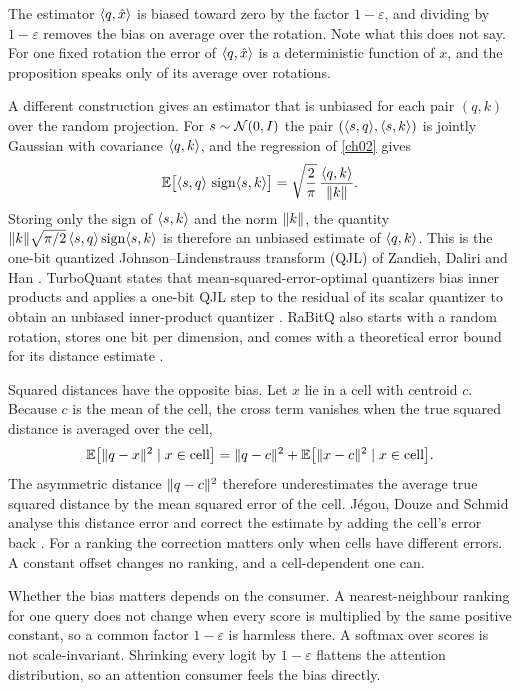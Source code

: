 The estimator $\langle q,\hat x\rangle$ is biased toward zero by the factor $1-\varepsilon$, and dividing by $1-\varepsilon$ removes the bias on average over the rotation. Note what this does not say. For one fixed rotation the error of $\langle q,\hat x\rangle$ is a deterministic function of $x$, and the proposition speaks only of its average over rotations.

A different construction gives an estimator that is unbiased for each pair $(q,k)$ over the random projection. For $s\sim\mathcal{N}(0,I)$ the pair $(\langle s,q\rangle,\langle s,k\rangle)$ is jointly Gaussian with covariance $\langle q,k\rangle$, and the regression of \cref{ch02} gives
\begin{equation}\label{eq:ch07:qjl}
\mathbb{E}\big[\langle s,q\rangle\,\operatorname{sign}\langle s,k\rangle\big]=\sqrt{\frac2\pi}\,\frac{\langle q,k\rangle}{\lVert k\rVert}.
\end{equation}
Storing only the sign of $\langle s,k\rangle$ and the norm $\lVert k\rVert$, the quantity $\lVert k\rVert\sqrt{\pi/2}\,\langle s,q\rangle\operatorname{sign}\langle s,k\rangle$ is therefore an unbiased estimate of $\langle q,k\rangle$. This is the one-bit quantized Johnson--Lindenstrauss transform (QJL) of Zandieh, Daliri and Han \cite{zandieh2024qjl}. TurboQuant states that mean-squared-error-optimal quantizers bias inner products and applies a one-bit QJL step to the residual of its scalar quantizer to obtain an unbiased inner-product quantizer \cite{zandieh2025turboquant}. RaBitQ also starts with a random rotation, stores one bit per dimension, and comes with a theoretical error bound for its distance estimate \cite{gao2024rabitq}.

Squared distances have the opposite bias. Let $x$ lie in a cell with centroid $c$. Because $c$ is the mean of the cell, the cross term vanishes when the true squared distance is averaged over the cell,
\begin{equation}\label{eq:ch07:distbias}
\mathbb{E}\big[\lVert q-x\rVert^2\mid x\in\text{cell}\big]=\lVert q-c\rVert^2+\mathbb{E}\big[\lVert x-c\rVert^2\mid x\in\text{cell}\big].
\end{equation}
The asymmetric distance $\lVert q-c\rVert^2$ therefore underestimates the average true squared distance by the mean squared error of the cell. J\'egou, Douze and Schmid analyse this distance error and correct the estimate by adding the cell's error back \cite{jegou2011pq}. For a ranking the correction matters only when cells have different errors. A constant offset changes no ranking, and a cell-dependent one can.

Whether the bias matters depends on the consumer. A nearest-neighbour ranking for one query does not change when every score is multiplied by the same positive constant, so a common factor $1-\varepsilon$ is harmless there. A softmax over scores is not scale-invariant. Shrinking every logit by $1-\varepsilon$ flattens the attention distribution, so an attention consumer feels the bias directly.

